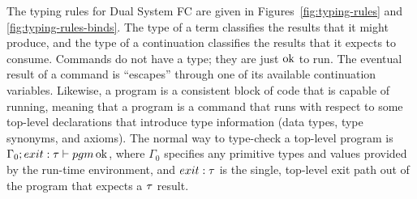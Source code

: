 \documentclass{article}
\begin{document}
The typing rules for Dual System FC are given in Figures~\ref{fig:typing-rules}
and \ref{fig:typing-rules-binds}.  The type of a term classifies the results
that it might produce, and the type of a continuation classifies the results
that it expects to consume.  Commands do not have a type; they are just $\operatorname{ok}$ to
run.  The eventual result of a command is ``escapes'' through one of its
available continuation variables.  Likewise, a program is a consistent block of
code that is capable of running, meaning that a program is a command that runs
with respect to some top-level declarations that introduce type information
(data types, type synonyms, and axioms).  The normal way to type-check a
top-level program is $\Gamma_0;exit:\tau \vdash pgm \operatorname{ok}$, where $\Gamma_0$
specifies any primitive types and values provided by the run-time environment,
and $exit:\tau$ is the single, top-level exit path out of the program that expects
a $\tau$ result.
\end{document}
